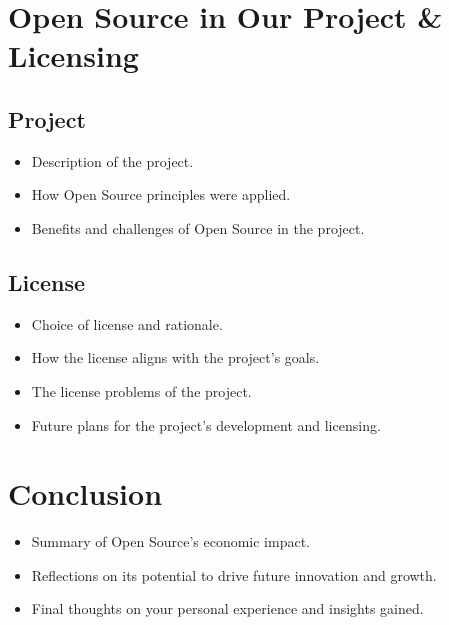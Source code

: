 \section{Open Source in Our Project \& Licensing}
\subsection{Project}

\begin{itemize}
    \item Description of the project.
    \item How Open Source principles were applied.
    \item Benefits and challenges of Open Source in the project.
\end{itemize}
\subsection{License}

\begin{itemize}
    \item Choice of license and rationale.
    \item How the license aligns with the project’s goals.
    \item The license problems of the project.
    \item Future plans for the project’s development and licensing.
\end{itemize}

\section{Conclusion}

\begin{itemize}
    \item Summary of Open Source’s economic impact.
    \item Reflections on its potential to drive future innovation and growth.
    \item Final thoughts on your personal experience and insights gained.
\end{itemize}

